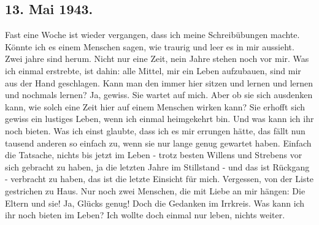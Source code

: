 \subsection{13. Mai 1943.}

Fast eine Woche ist wieder vergangen, dass ich meine Schreib\"{u}bungen machte.
K\"{o}nnte ich es einem Menschen sagen, wie traurig und leer es in mir aussieht.
Zwei jahre sind herum.
Nicht nur eine Zeit, nein Jahre stehen noch vor mir.
Was ich einmal erstrebte, ist dahin: alle Mittel, mir ein Leben aufzubauen, sind mir aus der Hand geschlagen.
Kann man den immer hier sitzen und lernen und lernen und nochmals lernen?
Ja, gewiss.
Sie wartet auf mich.
Aber ob sie sich ausdenken kann, wie solch eine Zeit hier auf einem Menschen wirken kann?
Sie erhofft sich gewiss ein lustiges Leben, wenn ich einmal heimgekehrt bin.
Und was kann ich ihr noch bieten.
Was ich einst glaubte, dass ich es mir errungen h\"{a}tte, das f\"{a}llt nun tausend anderen so einfach zu, wenn sie nur lange genug gewartet haben.
Einfach die Tatsache, nichts bis jetzt im Leben - trotz besten Willens und Strebens vor sich gebracht zu haben, ja die letzten Jahre im Stillstand - und das ist R\"{u}ckgang - verbracht zu haben, das ist die letzte Einsicht f\"{u}r mich.
Vergessen, von der Liste gestrichen zu Haus.
Nur noch zwei Menschen, die mit Liebe an mir h\"{a}ngen: Die Eltern und sie!
Ja, Gl\"{u}cks genug!
Doch die Gedanken im Irrkreis.
Was kann ich ihr noch bieten im Leben?
Ich wollte doch einmal nur leben, nichts weiter.

\clearpage
